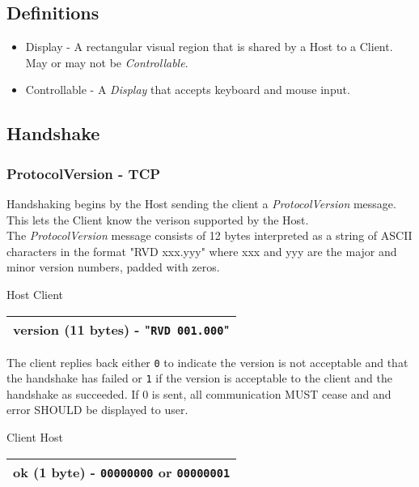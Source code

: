 \documentclass{article}
\begin{document}
    \subsection{Definitions}

    \begin{itemize}
        \item Display - A rectangular visual region that is shared by a Host to a Client. May or may not be \emph{Controllable}.
        \item Controllable - A \emph{Display} that accepts keyboard and mouse input.
    \end{itemize}

    \subsection{Handshake}

    \subsubsection{ProtocolVersion - TCP}
    Handshaking begins by the Host sending the client a \emph{ProtocolVersion} message. This lets the Client know the verison supported by the Host.\\

    The \emph{ProtocolVersion} message consists of 12 bytes interpreted as a string of ASCII characters in the format "RVD xxx.yyy" where xxx and yyy are the major and minor version numbers, padded with zeros.

    \begin{center}
        Host \textrightarrow Client\\
        \begin{tabular}{|c|}
            \hline
            version (11 bytes) -
            "\texttt{RVD 001.000}" \\
            \hline
        \end{tabular}
    \end{center}

    The client replies back either \texttt{0} to indicate the version is not acceptable and that the handshake has failed or \texttt{1} if the version is acceptable to the client and the handshake as succeeded. If 0 is sent, all communication MUST cease and and error SHOULD be displayed to user.

    \begin{center}
        Client \textrightarrow Host\\
        \begin{tabular}{|c|}
            \hline
            ok (1 byte) -
            \texttt{00000000} or \texttt{00000001} \\
            \hline
        \end{tabular}
    \end{center}
\end{document}
